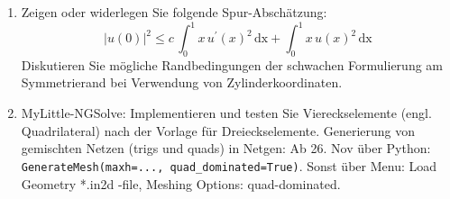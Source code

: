 \documentclass[11pt,a4paper]{report}
\begin{document}
\begin{enumerate}
\item Zeigen oder widerlegen Sie folgende Spur-Absch\"atzung:
$$
|u(0)|^2 \leq c \, \int_0^1 x \, u^\prime(x)^2 \, \text{dx} + \int_0^1
x \, u(x)^2 \, \text{dx}
$$
Diskutieren Sie m\"ogliche Randbedingungen der schwachen Formulierung
am Symmetrierand bei Verwendung von Zylinderkoordinaten.

\item 
MyLittle-NGSolve: Implementieren und testen Sie Viereckselemente
(engl. Quadrilateral) nach der Vorlage f\"ur
Dreieckselemente. Generierung von gemischten Netzen (trigs und quads) in Netgen: Ab
26. Nov \"uber Python: {\tt GenerateMesh(maxh=...,
  quad\_dominated=True)}. Sonst \"uber Menu: Load Geometry *.in2d -file, Meshing
  Options: quad-dominated.

\end{enumerate}
\end{document}
